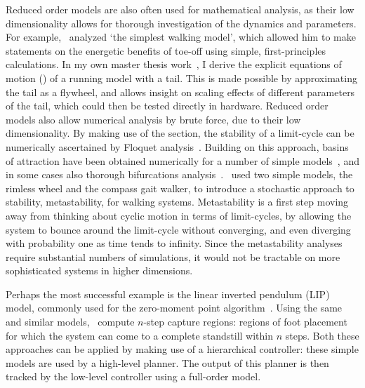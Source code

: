 Reduced order models are also often used for mathematical analysis, as their low dimensionality allows for thorough investigation of the dynamics and parameters. For example,~\textcite{kuo2002energetics} analyzed `the simplest walking model', which allowed him to make statements on the energetic benefits of toe-off using simple, first-principles calculations.
In my own master thesis work~\cite{heim2016designing}, I derive the explicit equations of motion (\eom) of a running model with a tail. This is made possible by approximating the tail as a flywheel, and allows insight on scaling effects of different parameters of the tail, which could then be tested directly in hardware.
Reduced order models also allow numerical analysis by brute force, due to their low dimensionality. By making use of the \poincare section, the stability of a limit-cycle can be numerically ascertained by Floquet analysis~\cite{remy2011matlab}. Building on this approach, basins of attraction have been obtained numerically for a number of simple models~\cite{schwab2001basin,obayashi2016formation,cnops2015basin,rummel2008stable}, and in some cases also thorough bifurcations analysis~\cite{aoi2006bifurcation,merker2015stable,gan2018all}.~\textcite{byl2009metastable} used two simple models, the rimless wheel and the compass gait walker, to introduce a stochastic approach to stability, metastability, for walking systems. Metastability is a first step moving away from thinking about cyclic motion in terms of limit-cycles, by allowing the system to bounce around the limit-cycle without converging, and even diverging with probability one as time tends to infinity. Since the metastability analyses require substantial numbers of simulations, it would not be tractable on more sophisticated systems in higher dimensions. \par
Perhaps the most successful example is the linear inverted pendulum (LIP) model, commonly used for the zero-moment point algorithm~\cite{kajita2001LIP,kajita2003ZMP}. Using the same and similar models,~\textcite{koolen2012capturability} compute $n$-step capture regions: regions of foot placement for which the system can come to a complete standstill within $n$ steps. Both these approaches can be applied by making use of a hierarchical controller: these simple models are used by a high-level planner. The output of this planner is then tracked by the low-level controller using a full-order model.

